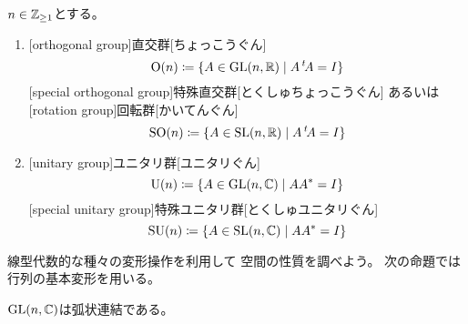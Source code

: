 \documentclass[report]{jlreq}
\begin{document}
\begin{definition}[直交群とユニタリ群]
    $n \in \mathbb{Z}_{\ge 1}$とする。
    \begin{enumerate}
        \item
            [orthogonal group]{直交群}[ちょっこうぐん]
            \begin{equation}
                \operatorname{\mathrm{O}}(n)
                    \coloneqq \{
                        A \in \operatorname{\mathrm{GL}}(n, \mathbb{R}) \mid A \,{}^{t}\!A = I
                    \}
            \end{equation}
            [special orthogonal group]{特殊直交群}[とくしゅちょっこうぐん]
            あるいは
            [rotation group]{回転群}[かいてんぐん]
            \begin{equation}
                \operatorname{\mathrm{SO}}(n)
                    \coloneqq \{
                        A \in \operatorname{\mathrm{SL}}(n, \mathbb{R}) \mid A \,{}^{t}\!A = I
                    \}
            \end{equation}
        \item
            [unitary group]{ユニタリ群}[ユニタリぐん]
            \begin{equation}
                \operatorname{\mathrm{U}}(n)
                    \coloneqq \{
                        A \in \operatorname{\mathrm{GL}}(n, \mathbb{C}) \mid AA^* = I
                    \}
            \end{equation}
            [special unitary group]{特殊ユニタリ群}[とくしゅユニタリぐん]
            \begin{equation}
                \operatorname{\mathrm{SU}}(n)
                    \coloneqq \{
                        A \in \operatorname{\mathrm{SL}}(n, \mathbb{C}) \mid AA^* = I
                    \}
            \end{equation}
    \end{enumerate}
\end{definition}

線型代数的な種々の変形操作を利用して
空間の性質を調べよう。
次の命題では行列の基本変形を用いる。

\begin{proposition}
    $\operatorname{\mathrm{GL}}(n, \mathbb{C})$は弧状連結である。
\end{proposition}
\end{document}
